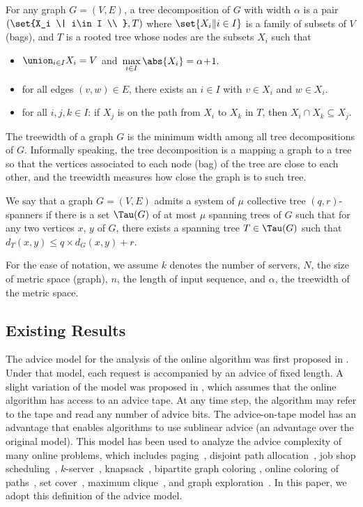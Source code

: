 For any graph $G=(V,E)$, a tree decomposition of $G$ with width $\alpha$ is a pair $(\set{X_i \| i\in I \\ }, T)$ where $\set{X_i \| i\in I}$ is a family of subsets of $V$ (bags), and $T$ is a rooted tree whose nodes are the subsets $X_i$ such that
\begin{itemize}
	\item $\union_{i\in I} X_i = V$ and $\,\max\limits_{i\in I} \abs{X_i} = \alpha \!+\!1.$ 
	\item for all edges $(v,w)\in E$, there exists an $i\in I$ with $v\in X_i$ and $w\in X_i$. 
	\item for all $i,j,k \in I$: if $X_j$ is on the path from $X_i$ to $X_k$ in $T$, then $X_i \cap X_k \subseteq X_j$.
\end{itemize}

The treewidth of a graph $G$ is the minimum width among all tree decompositions of $G$. 
Informally speaking, the tree decomposition is a mapping a graph to a tree so that the vertices associated to each node (bag) of the tree are close to each other, and the treewidth measures how close the graph is to such tree. 

We say that a graph $G = (V,E)$ admits a system of $\mu$ collective tree $(q,r)$-spanners if there is a set $\Tau(G)$ of at most $\mu$ spanning trees of $G$ such that for any two vertices $x$, $y$ of $G$, there exists a spanning tree $T \in \Tau(G)$ such that $d_T(x, y) \leq q \times d_G(x, y) + r$.

For the ease of notation, we assume $k$ denotes the number of servers, $N$, the size of metric space (graph), $n$, the length of input sequence, and $\alpha$, the treewidth of the metric space. 

\subsection{Existing Results}

The advice model for the analysis of the online algorithm was first proposed in \cite{Emek2011}. Under that model, each request is accompanied by an advice of fixed length. A slight variation of the model was proposed in \cite{ISSAC09,Bock11}, which assumes that the online algorithm has access to an advice tape. At any time step, the algorithm may refer to the tape and read any number of advice bits. 
The advice-on-tape model has an advantage that enables algorithms to use sublinear advice (an advantage over the original model). This model has been used to analyze the advice complexity of many online problems, which includes paging~\cite{ISSAC09,MFCS10,SOFSEM11}, 
disjoint path allocation~\cite{ISSAC09}, job shop scheduling~\cite{ISSAC09,SOFSEM11}, $k$-server~\cite{Bock11}, knapsack~\cite{LATIN12}, bipartite graph coloring \cite{COCOON12}, online coloring of paths~\cite{LATA12}, 
set cover~\cite{CSR12,ECCC12}, maximum clique~\cite{ECCC12}, and graph exploration~\cite{SIROCCO12}. In this paper, we adopt this definition of the advice model.

